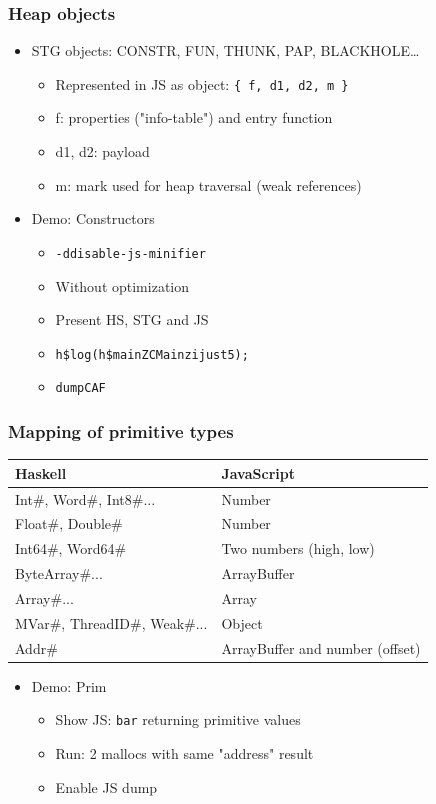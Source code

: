 \documentclass[aspectratio=169]{beamer}
\begin{document}
\begin{frame}
\frametitle{Heap objects}
  \begin{itemize}
    \item STG objects: CONSTR, FUN, THUNK, PAP, BLACKHOLE…
      \begin{itemize}
        \item Represented in JS as object: \texttt{\{ f, d1, d2, m \}}
        \item f: properties ("info-table") and entry
          function
        \item d1, d2: payload
        \item m: mark used for heap traversal (weak references)
      \end{itemize}
    \item Demo: Constructors
      \begin{itemize}
        \item \texttt{-ddisable-js-minifier}
        \item Without optimization
        \item Present HS, STG and JS
        \item \texttt{h\$log(h\$mainZCMainzijust5);}
        \item \texttt{dumpCAF}
      \end{itemize}
  \end{itemize}
\end{frame}


\begin{frame}
  \frametitle{Mapping of primitive types}
  \begin{tabular}{ll}
    \hline
    Haskell & JavaScript \\ \hline
    Int\#, Word\#, Int8\#... & Number \\
    Float\#, Double\#        & Number\\
    Int64\#, Word64\#        & Two numbers (high, low) \\
    ByteArray\#...           & ArrayBuffer\\
    Array\#...               & Array\\
    MVar\#, ThreadID\#, Weak\#... & Object\\
    Addr\#                   & \alert{ArrayBuffer and number (offset)}\\
  \end{tabular}
  \hspace{1cm}
  \begin{itemize}
    \item Demo: Prim
      \begin{itemize}
        \item Show JS: \texttt{bar} returning primitive values
        \item Run: 2 mallocs with same "address" result
        \item Enable JS dump
      \end{itemize}
  \end{itemize}
\end{frame}
\end{document}
